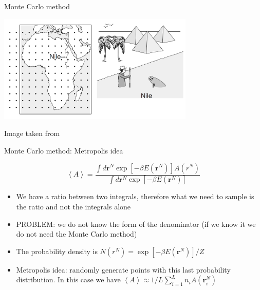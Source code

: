 \documentclass{beamer}
\begin{document}
\begin{frame} {Monte Carlo method \cite{peliti2011statistical}}

 \begin{center}
     \includegraphics[width=0.7\textwidth]{Pic/Pic_river.png}
\end{center}
 \begin{center}
Image taken from \cite{frenkel2001understanding}
\end{center}
\end{frame}


\begin{frame}{Monte Carlo method: Metropolis idea \cite{frenkel2001understanding}}


\begin{equation}
\left\langle A \right\rangle=\dfrac{\int d\textbf{r}^{N}\exp\left[ -\beta E(\textbf{r}^{N}) \right]A(r^{N})}{\int d\textbf{r}^{N}\exp\left[ -\beta E(\textbf{r}^{N}) \right]}
\end{equation}

\begin{itemize}
\item We have a ratio between two integrals, therefore what we need to sample is the ratio and not the integrals alone
 \item PROBLEM: we do not know the form of the denominator (if we know it we do not need the Monte Carlo method)
\item The probability density is $N(r^{N})=\exp\left[-\beta E(\textbf{r}^{N}) \right]/Z$
\item Metropolis idea: randomly generate points with this last probability distribution. In this case we have $\left\langle A \right\rangle \approx 1/L\sum_{i=1}^{L}n_{i}A(\textbf{r}_{i}^{N})$

\end{itemize}
\end{frame}
\end{document}
